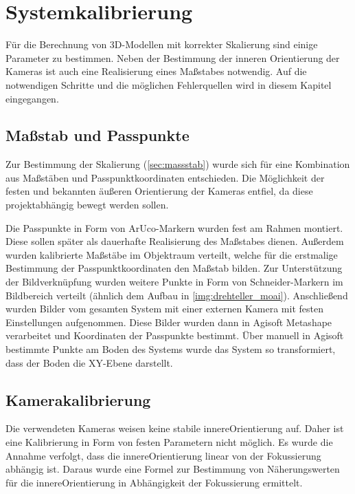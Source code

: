 \documentclass[./00PhotoBox.tex]{subfiles}
\begin{document}
\chapter{Systemkalibrierung}
\label{ch:kalibrierung}

Für die Berechnung von 3D-Modellen mit korrekter Skalierung sind einige Parameter zu bestimmen. Neben der Bestimmung der inneren Orientierung der Kameras ist auch eine Realisierung eines Maßstabes notwendig. Auf die notwendigen Schritte und die möglichen Fehlerquellen wird in diesem Kapitel eingegangen.

\section{Maßstab und Passpunkte}
\label{sec:passpunkt_bestimmung}
Zur Bestimmung der Skalierung (\autoref{sec:massstab}) wurde sich für eine Kombination aus Maß\-stäben und Passpunktkoordinaten entschieden. Die Möglichkeit der festen und bekannten äußeren Orientierung der Kameras entfiel, da diese projektabhängig bewegt werden sollen.

Die Passpunkte in Form von ArUco-Markern wurden fest am Rahmen montiert. Diese sollen später als dauerhafte Realisierung des Maßstabes dienen. Außerdem wurden kalibrierte Maßstäbe im Objektraum verteilt, welche für die erstmalige Bestimmung der Passpunktkoordinaten den Maßstab bilden. Zur Unterstützung der Bildverknüpfung wurden weitere Punkte in Form von Schneider-Markern im Bildbereich verteilt (ähnlich dem Aufbau in \autoref{img:drehteller_moai}). Anschließend wurden Bilder vom gesamten System mit  einer externen Kamera mit festen Einstellungen aufgenommen. Diese Bilder wurden dann in Agisoft Metashape verarbeitet und Koordinaten der Passpunkte bestimmt. Über manuell in Agisoft bestimmte Punkte am Boden des Systems wurde das System so transformiert, dass der Boden die XY-Ebene darstellt.

\section{Kamerakalibrierung}
Die verwendeten Kameras weisen keine stabile \gls{innereOrientierung} auf. Daher ist eine Kalibrierung in Form von festen Parametern nicht möglich. Es wurde die Annahme verfolgt, dass die \gls{innereOrientierung} linear von der Fokussierung abhängig ist. Daraus wurde eine Formel zur Bestimmung von Näherungswerten für die \gls{innereOrientierung} in Abhängigkeit der Fokussierung ermittelt.
\end{document}
